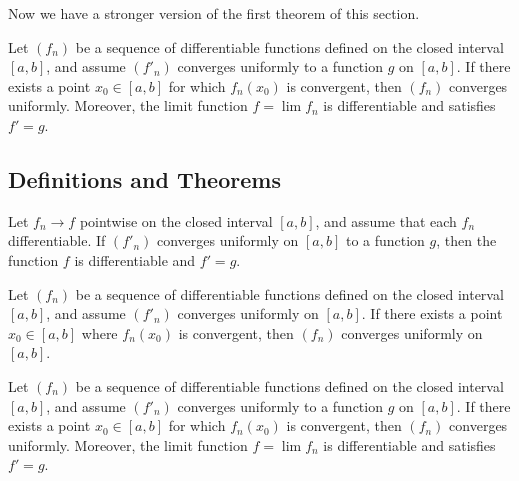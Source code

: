Now we have a stronger version of the first theorem of this section.

\begin{tcolorbox}
\begin{thm}
    Let \( (f_n)  \) be a sequence of differentiable functions defined on the closed interval \( [a,b]  \), and assume \( (f'_n)  \) converges uniformly to a function \( g  \) on \( [a,b]  \). If there exists a point \( x_0 \in [a,b]  \) for which \( f_n(x_0)  \) is convergent, then \( (f_n)  \) converges uniformly. Moreover, the limit function \( f = \lim f_n  \) is differentiable and satisfies \( f' = g  \).
\end{thm}
\end{tcolorbox}

\subsection{Definitions and Theorems}


\begin{tcolorbox}
    \begin{thm}
        Let \( f_n \to f  \) pointwise on the closed interval \( [a,b] \), and assume that each \( f_n  \) differentiable. If \( (f'_n) \) converges uniformly on \( [a,b] \) to a function \( g  \), then the function \( f  \) is differentiable and \( f' = g  \).
    \end{thm}
\end{tcolorbox}


\begin{tcolorbox}
\begin{thm}
    Let \( (f_n)  \) be a sequence of differentiable functions defined on the closed interval \( [a,b]  \), and assume \( (f'_n)  \) converges uniformly on \( [a,b]  \). If there exists a point \( x_0 \in [a,b]  \) where \( f_n(x_0)  \) is convergent, then \( (f_n)  \) converges uniformly on \( [a,b]  \).
\end{thm}
\end{tcolorbox}


\begin{tcolorbox}
\begin{thm}
    Let \( (f_n)  \) be a sequence of differentiable functions defined on the closed interval \( [a,b]  \), and assume \( (f'_n)  \) converges uniformly to a function \( g  \) on \( [a,b]  \). If there exists a point \( x_0 \in [a,b]  \) for which \( f_n(x_0)  \) is convergent, then \( (f_n)  \) converges uniformly. Moreover, the limit function \( f = \lim f_n  \) is differentiable and satisfies \( f' = g  \).
\end{thm}
\end{tcolorbox}

